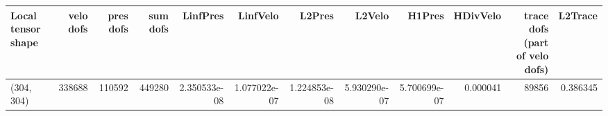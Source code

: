 \begin{tabular}{lrrrrrrrrrrr}
\toprule
Local tensor shape &  velo dofs &  pres dofs &  sum dofs &     LinfPres &     LinfVelo &       L2Pres &       L2Velo &       H1Pres &  HDivVelo &  trace dofs (part of velo dofs) &  L2Trace \\
\midrule
        (304, 304) &     338688 &     110592 &    449280 & 2.350533e-08 & 1.077022e-07 & 1.224853e-08 & 5.930290e-07 & 5.700699e-07 &  0.000041 &                           89856 & 0.386345 \\
\bottomrule
\end{tabular}
